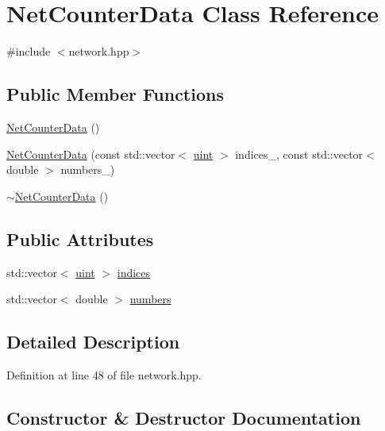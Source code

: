 \hypertarget{class_net_counter_data}{}\section{Net\+Counter\+Data Class Reference}
\label{class_net_counter_data}


{\ttfamily \#include $<$network.\+hpp$>$}

\subsection*{Public Member Functions}
\begin{DoxyCompactItemize}
\item 
\hyperlink{class_net_counter_data_ac3a5083286ad4fad43e6b6d5db1f7caa}{Net\+Counter\+Data} ()
\item 
\hyperlink{class_net_counter_data_ac816e1f8892a4d6f500df387309c1b1b}{Net\+Counter\+Data} (const std\+::vector$<$ \hyperlink{typedefs_8hpp_a91ad9478d81a7aaf2593e8d9c3d06a14}{uint} $>$ indices\+\_\+, const std\+::vector$<$ double $>$ numbers\+\_\+)
\item 
\hyperlink{class_net_counter_data_a2e88fcc7f0296d791fe9f0facd24489f}{$\sim$\+Net\+Counter\+Data} ()
\end{DoxyCompactItemize}
\subsection*{Public Attributes}
\begin{DoxyCompactItemize}
\item 
std\+::vector$<$ \hyperlink{typedefs_8hpp_a91ad9478d81a7aaf2593e8d9c3d06a14}{uint} $>$ \hyperlink{class_net_counter_data_ae2f47af99f3fa785d3faac089ab90d83}{indices}
\item 
std\+::vector$<$ double $>$ \hyperlink{class_net_counter_data_ad218e01cd14fb4abfbe21d8d92a6cbd3}{numbers}
\end{DoxyCompactItemize}


\subsection{Detailed Description}


Definition at line 48 of file network.\+hpp.



\subsection{Constructor \& Destructor Documentation}
\mbox{\label{class_net_counter_data_ac3a5083286ad4fad43e6b6d5db1f7caa}} 
